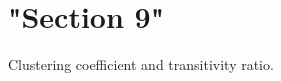 \chapter{"{}\+Section 9"{}}
\hypertarget{SECTION_9}{}\label{SECTION_9}
Clustering coefficient and transitivity ratio.
